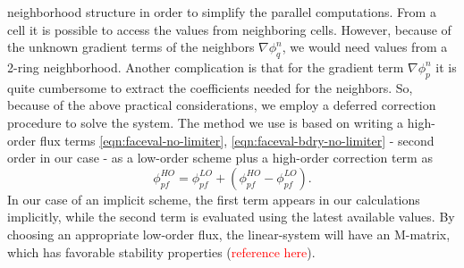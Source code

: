 \documentclass[../thesis.tex]{subfiles}
\begin{document}
neighborhood structure in order to simplify the parallel computations. From a
cell it is possible to access the values from neighboring cells. However,
because of the unknown gradient terms of the neighbors \(\nabla\phi_q^{n}\),
we would need values from a 2-ring neighborhood. Another complication is that
for the gradient term \(\nabla\phi_p^n\) it is quite cumbersome to extract
the coefficients needed for the neighbors. So, because of the above practical
considerations, we employ a deferred correction procedure
\cite{1974_Khosla,2016_Moukalled_BOOK,2019_Hahn} to solve the system.
The method we use is based on writing a high-order flux terms
\eqref{eqn:faceval-no-limiter}, \eqref{eqn:faceval-bdry-no-limiter} - second order
in our case - as a low-order scheme plus a high-order correction term as
\begin{equation}\label{eqn:high-order-low-order-combination}
	\phi_{pf}^{HO} = \phi_{pf}^{LO} + (\phi_{pf}^{HO} - \phi_{pf}^{LO}).
\end{equation}
In our case of an implicit scheme, the first term appears in our calculations
implicitly, while the second term is evaluated using the latest available values.
By choosing an appropriate low-order flux, the linear-system will have an
M-matrix, which has favorable stability properties (\textcolor{red}{reference here}).
\end{document}
